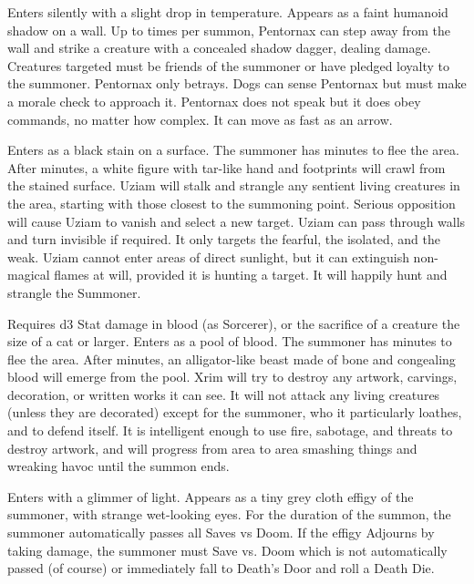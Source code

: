 {
Enters silently with a slight drop in temperature. Appears as a faint humanoid shadow on a wall. Up to \DICE times per summon, Pentornax can step away from the wall and strike a creature with a concealed shadow dagger, dealing \SUMDICE damage. Creatures targeted must be friends of the summoner or have pledged loyalty to the summoner. Pentornax only betrays. Dogs can sense Pentornax but must make a morale check to approach it. Pentornax does not speak but it does obey commands, no matter how complex. It can move as fast as an arrow.


Enters as a black stain on a surface. The summoner has \SUMDICE minutes to flee the area. After \SUMDICE minutes, a white figure with tar-like hand and footprints will crawl from the stained surface. Uziam will stalk and strangle any sentient living creatures in the area, starting with those closest to the summoning point. Serious opposition will cause Uziam to vanish and select a new target. Uziam can pass through walls and turn invisible if required. It only targets the fearful, the isolated, and the weak. Uziam cannot enter areas of direct sunlight, but it can extinguish non-magical flames at will, provided it is hunting a target. It will happily hunt and strangle the Summoner.



Requires d3 Stat damage in blood (as Sorcerer), or the sacrifice of a creature the size of a cat or larger.  Enters as a pool of blood. The summoner has \SUMDICE minutes to flee the area. After \SUMDICE minutes, an alligator-like beast made of bone and congealing blood will emerge from the pool. Xrim will try to destroy any artwork, carvings, decoration, or written works it can see. It will not attack any living creatures (unless they are decorated) except for the summoner, who it particularly loathes, and to defend itself. It is intelligent enough to use fire, sabotage, and threats to destroy artwork, and will progress from area to area smashing things and wreaking havoc until the summon ends.



Enters with a glimmer of light. Appears as a tiny grey cloth effigy of the summoner, with strange wet-looking eyes. For the duration of the summon, the summoner automatically passes all Saves vs Doom. If the effigy Adjourns by taking damage, the summoner must Save vs. Doom which is not automatically passed (of course) or immediately fall to Death's Door and roll a Death Die.


}
